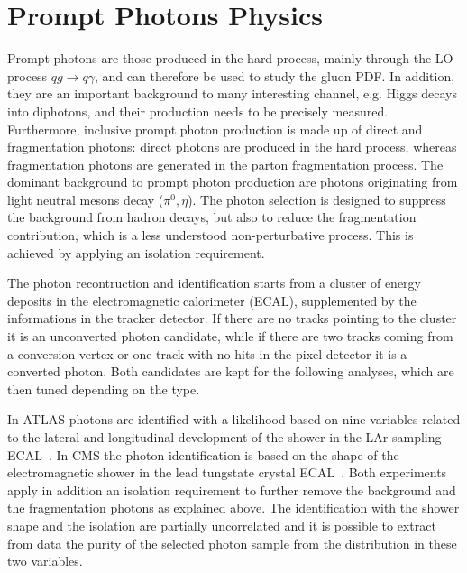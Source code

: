 \documentclass{PoS}
\begin{document}
\section{Prompt Photons Physics}

Prompt photons are those produced in the hard process, mainly through the LO process $qg \to q\gamma$, and can therefore
be used to study the gluon PDF. In addition, they are an important background to many interesting channel, e.g. Higgs
decays into diphotons, and their production needs to be precisely measured.  
Furthermore, inclusive prompt photon production is made up of direct and fragmentation photons: direct photons
are produced in the hard process, whereas fragmentation photons are generated in the parton fragmentation process. 
The dominant background to prompt photon production are photons originating from light neutral mesons decay ($\pi^0,
\eta$). 
The photon selection is designed to suppress the background from hadron decays, but also to reduce the fragmentation
contribution, which is a less understood non-perturbative process. This is achieved by applying an isolation requirement. 

The photon recontruction and identification starts from a cluster of energy deposits in the electromagnetic calorimeter
(ECAL), supplemented by the informations in the tracker detector. If there are no tracks pointing to the cluster it is an
unconverted photon candidate, while if there are two tracks coming from a conversion vertex or one track with no hits in
the pixel detector it is a converted photon. Both candidates are kept for the following analyses, which are then tuned
depending on the type. 

In ATLAS photons are identified with a likelihood based on nine variables related to the lateral and longitudinal
development of the shower in the LAr sampling ECAL~\cite{ATLAS:2012ana}. In CMS the photon identification is
based on the shape of the electromagnetic shower in the lead tungstate crystal ECAL~\cite{Chatrchyan:2013dga}.
Both experiments apply in addition an isolation requirement to further remove the background and the fragmentation
photons as explained above. The identification with the shower shape and the isolation are partially uncorrelated and
it is possible to extract from data the purity of the selected photon sample from the distribution in these two variables. 
\end{document}
